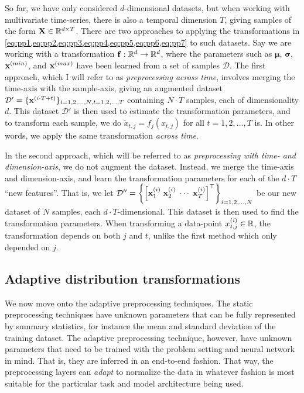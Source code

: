 \documentclass{statsmsc}
\begin{document}
{So far, we have only considered $d$-dimensional datasets, but when working with multivariate
time-series, there is also a temporal dimension $T$, giving samples of the form
$\mathbf{X} \in \mathbb{R}^{d\times T}$. There are two approaches to applying the
transformations in \cref{eq:pp1,eq:pp2,eq:pp3,eq:pp4,eq:pp5,eq:pp6,eq:pp7}
to such datasets. Say we are working with a transformation $\mathbf{f}: \mathbb{R}^d \rightarrow {\mathbb{R}^d}$, where the
parameters such as $\bm\mu$, $\bm\sigma$, $\mathbf{x}^{(min)}$, and $\mathbf{x}^{(max)}$ have been learned
from a set of samples $\mathcal{D}$. The first approach, which I will refer to as
\textit{preprocessing across time}, involves merging the time-axis with the sample-axis, giving
an augmented dataset $\mathcal{D}'=\{\mathbf{x}^{(i\cdot T +t)}\}_{i=1,2,\dots,N,t=1,2,\dots,T}$
containing $N \cdot T$ samples, each of dimensionality $d$. This dataset $\mathcal{D}'$ is then
used to estimate the transformation parameters, and to transform each sample, we do
$\tilde{x}_{t,j}=f_j(x_{t,j})$ for all $t=1,2,\dots,T$ is. In other words, we apply the same
transformation \textit{across time}.

In the second approach, which will be referred to as
\textit{preprocessing with time- and dimension-axis}, we do not augment the dataset. Instead,
we merge the time-axis and dimension-axis, and learn the transformation parameters for
each of the $d \cdot T$ ``new features''. That is, we let
$\mathcal{D}''=\left\{\left[\mathbf{x}^{(i)}_{1} \; \mathbf{x}^{(i)}_{2} \; \cdots \; \mathbf{x}^{(i)}_{T} \right]^\top \right\}_{i=1,2,\dots,N}$ be our new dataset of $N$ samples, each $d\cdot T$-dimensional.
This dataset is then used to find the transformation parameters.
When transforming a data-point $x^{(i)}_{t,j}\in\mathbb{R}$, the transformation depends on both $j$ and $t$,
unlike the first method which only depended on $j$.


\subsection{Adaptive distribution transformations}%
\label{sub:Adaptive distribution transformations}

We now move onto the adaptive preprocessing techniques. The static
preprocessing techniques have unknown parameters that can be fully represented
by summary statistics, for instance the mean and standard deviation of the
training dataset. The adaptive preprocessing technique, however, have unknown
parameters that need to be trained with the problem setting and neural network in
mind.  That is, they are inferred in an end-to-end fashion. That way, the
preprocessing layers can \textit{adapt} to normalize the data in whatever
fashion is most suitable for the particular task and model architecture being used.

}
\end{document}

